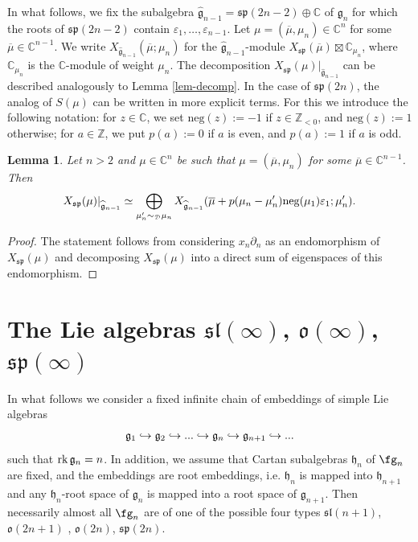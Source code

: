 \documentclass[12pt]{amsart}
\newcommand{\C}{{\mathbb C}}
\newcommand{\Z}{{\mathbb Z}}
\def\gg{\mathfrak{g}}
\def\gh{\mathfrak{h}}
\def\Z{\mathbb{Z}}
\def\gh{\mathfrak h}
\newtheorem{lem}[thm]{Lemma}
\begin{document}
In what follows, we fix the subalgebra $\widehat{\gg}_{n-1} = \mathfrak{sp}({2n-2}) \oplus \C$ of $\gg_n$ for which the roots of $\mathfrak{sp}({2n-2})$ contain  $\varepsilon_1,\dots,\varepsilon_{n-1}$. Let $\mu  = (\overline{\mu}, \mu_{n}) \in {\mathbb C}^{n}$ for some $\overline{\mu} \in {\mathbb C}^{n-1}$. 
We write $X_{\widehat{\gg}_{n-1}} (\overline{\mu}; \mu_n)$ for the $\widehat{\gg}_{n-1}$-module $X_{\mathfrak{sp}} (\overline{\mu}) \boxtimes \C_{\mu_n}$, where $\C_{\mu_n}$ is the $\C$-module of weight $\mu_n$. The decomposition $X_{\mathfrak{sp}}(\mu)|_{\widehat{\gg}_{n-1}}$ can be described analogously to  Lemma \ref{lem-decomp}. In the case of $\mathfrak{sp} (2n)$, the analog of $S(\mu)$ can be written in more explicit terms. For this we introduce the following notation: for $z \in {\C}$, we set $\mbox{neg} (z) := -1$ if $z \in \Z_{<0}$, and $\mbox{neg} (z) := 1$ otherwise; for $a \in \Z$, we put $p(a) :=0$ if $a$ is even, and $p(a) :=1$ if $a$ is odd.
\begin{lem} \label{prop-restr-sp2n}
Let $n>2$ and $\mu \in \C^{n}$ be such that $\mu  = (\overline{\mu}, \mu_{n})$ for some $\overline{\mu} \in {\mathbb C}^{n-1}$.
Then 
$$
X_{\mathfrak{sp}}(\mu)|_{\widehat{\gg}_{n-1}} \simeq \bigoplus_{\mu_n' \sim_{\mathcal D} \mu_n} X_{\widehat{\gg}_{n-1}}(\overline{\mu} + p(\mu_n - \mu_n'){\rm neg} (\mu_1)\varepsilon_1; \mu_n').
$$

\end{lem}
\begin{proof}
The statement follows from considering $x_{n} \partial_n$ as an endomorphism of $X_{\mathfrak{sp}}(\mu)$ and decomposing  $X_{\mathfrak{sp}}(\mu)$  into a direct sum of eigenspaces of this endomorphism. 
\end{proof}

\section{The Lie algebras  $\mathfrak{sl}(\infty)$, $\mathfrak{o}(\infty)$, $\mathfrak{sp}(\infty)$}

In what follows we consider a fixed infinite chain of embeddings of simple Lie algebras
\begin{equation*}\frak g_1\hookrightarrow\frak g_2\hookrightarrow...\hookrightarrow\frak g_n\hookrightarrow\frak g_{n+1}\hookrightarrow...
\end{equation*}
such that $\textup{rk}\, \mathfrak{g}_n=n$. In addition, we assume that Cartan subalgebras $\mathfrak{h}_n$ of $\fg_n$ are fixed, and  the embeddings are root embeddings, i.e. $\gh_n$ is mapped into  $\gh_{n+1}$ and any $\gh_n$-root space of $\gg_n$ is mapped into a root space of $\gg_{n+1}$.  Then necessarily almost all $\fg_n$ are of one of the possible four types $\mathfrak{sl}({n+1})$, $\mathfrak{o}({2n+1})$ , $\mathfrak{o}({2n})$, $\mathfrak{sp}({2n})$.
\end{document}
